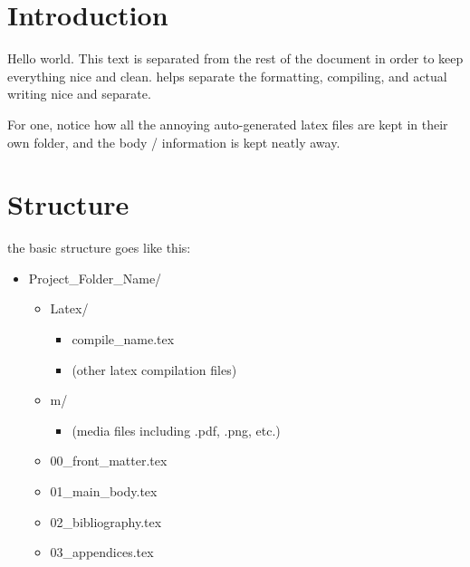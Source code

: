 \section{Introduction}

Hello world. This text is separated from the rest of the document in order to keep everything nice and clean. helps separate the formatting, compiling, and actual writing nice and separate. 

For one, notice how all the annoying auto-generated latex files are kept in their own folder, and the body / information is kept neatly away. 

\section{Structure}
the basic structure goes like this:
\begin{itemize} \itemsep=-1em
    \item Project\_Folder\_Name/
    \begin{itemize} 
        \item Latex/
        \begin{itemize} 
            \item compile\_name.tex
            \item (other latex compilation files)
        \end{itemize}
        \item m/
        \begin{itemize} 
            \item (media files including .pdf, .png, etc.)
        \end{itemize}
        \item 00\_front\_matter.tex
        \item 01\_main\_body.tex
        \item 02\_bibliography.tex
        \item 03\_appendices.tex
    \end{itemize}
\end{itemize} %